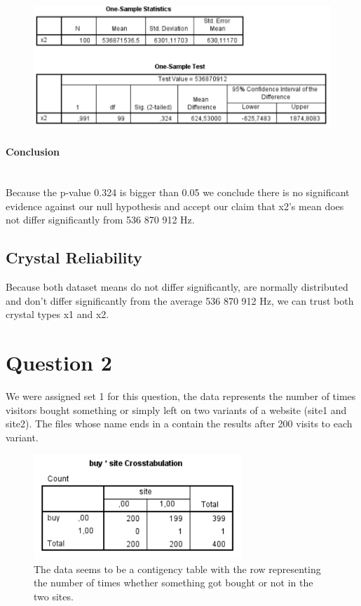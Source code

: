 \documentclass[14]{article}
\begin{document}
\begin{figure}[!htb]
	\includegraphics[width=1.0\textwidth]{img/question1/question1_x2_T.PNG}
	\captionsetup{width=1.0\textwidth}
	\centering 
\end{figure}

\paragraph{Conclusion}\mbox{}\\
Because the p-value 0.324 is bigger than 0.05 we conclude there is no significant evidence against our null hypothesis and accept our claim that x2's mean does not differ significantly from 536 870 912 Hz.

\subsection{Crystal Reliability}
Because both dataset means do not differ significantly, are normally distributed and don't differ significantly from the average 536 870 912 Hz, we can trust both crystal types x1 and x2. 

\newpage
\section{Question 2}
We were assigned set 1 for this question, the data represents the number of times visitors bought something or simply left on two variants of a website (site1 and site2). The files whose name ends in a contain the results after 200 visits to each variant.

\begin{figure}[!htb]
	\includegraphics[width=0.7\textwidth]{img/question2/question2_a.PNG}
	\captionsetup{width=0.8\textwidth}
	\centering 
	\caption{The data seems to be a contigency table with the row representing the number of times whether something got bought or not in the two sites. } 
\end{figure}
\end{document}
